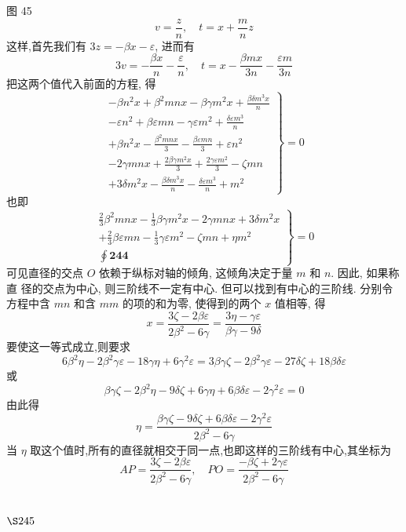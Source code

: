 图 45
\[
v=\frac{z}{n}, \quad t=x+\frac{m}{n} z
\]
这样,首先我们有 $3 z=-\beta x-\varepsilon$, 进而有
\[
3 v=-\frac{\beta x}{n}-\frac{\varepsilon}{n}, \quad t=x-\frac{\beta m x}{3 n}-\frac{\varepsilon m}{3 n}
\]
把这两个值代入前面的方程, 得
\[
\left.\begin{array}{l}
-\beta n^{2} x+\beta^{2} m n x-\beta \gamma m^{2} x+\frac{\beta \delta m^{3} x}{n} \\
-\varepsilon n^{2}+\beta \varepsilon m n-\gamma \varepsilon m^{2}+\frac{\delta \varepsilon m^{3}}{n} \\
+\beta n^{2} x-\frac{\beta^{2} m n x}{3}-\frac{\beta \varepsilon m n}{3}+\varepsilon n^{2} \\
-2 \gamma m n x+\frac{2 \beta \gamma m^{2} x}{3}+\frac{2 \gamma \varepsilon m^{2}}{3}-\zeta m n \\
+3 \delta m^{2} x-\frac{\beta \delta m^{3} x}{n}-\frac{\delta \varepsilon m^{3}}{n}+m^{2}
\end{array}\right\}=0
\]
也即
\[
\left.\begin{array}{c}
\frac{2}{3} \beta^{2} m n x-\frac{1}{3} \beta \gamma m^{2} x-2 \gamma m n x+3 \delta m^{2} x \\
+\frac{2}{3} \beta \varepsilon m n-\frac{1}{3} \gamma \varepsilon m^{2}-\zeta m n+\eta m^{2} \\
\oint \mathbf{2 4 4}
\end{array}\right\}=0
\]
可见直径的交点 $O$ 依赖于纵标对轴的倾角, 这倾角决定于量 $m$ 和 $n$. 因此, 如果称直 径的交点为中心, 则三阶线不一定有中心. 但可以找到有中心的三阶线. 分别令方程中含 $m n$ 和含 $m m$ 的项的和为零, 使得到的两个 $x$ 值相等, 得
\[
x=\frac{3 \zeta-2 \beta \varepsilon}{2 \beta^{2}-6 \gamma}=\frac{3 \eta-\gamma \varepsilon}{\beta \gamma-9 \delta}
\]
要使这一等式成立,则要求
\[
6 \beta^{2} \eta-2 \beta^{2} \gamma \varepsilon-18 \gamma \eta+6 \gamma^{2} \varepsilon=3 \beta \gamma \zeta-2 \beta^{2} \gamma \varepsilon-27 \delta \zeta+18 \beta \delta \varepsilon
\]
或
\[
\beta \gamma \zeta-2 \beta^{2} \eta-9 \delta \zeta+6 \gamma \eta+6 \beta \delta \varepsilon-2 \gamma^{2} \varepsilon=0
\]
由此得
\[
\eta=\frac{\beta \gamma \zeta-9 \delta \zeta+6 \beta \delta \varepsilon-2 \gamma^{2} \varepsilon}{2 \beta^{2}-6 \gamma}
\]
当 $\eta$ 取这个值时,所有的直径就相交于同一点,也即这样的三阶线有中心,其坐标为
\[
A P=\frac{3 \zeta-2 \beta \varepsilon}{2 \beta^{2}-6 \gamma}, \quad P O=\frac{-\beta \zeta+2 \gamma \varepsilon}{2 \beta^{2}-6 \gamma}
\]
\section{$\S 245$}

